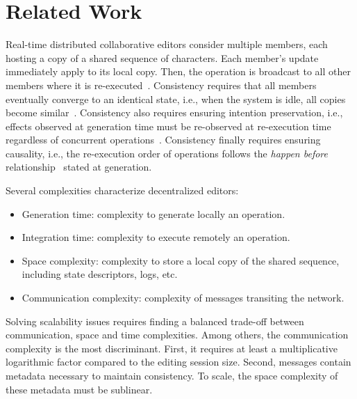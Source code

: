 \section{Related Work}
\label{sec:relatedwork}

Real-time distributed collaborative editors consider multiple members, each
hosting a copy of a shared sequence of characters. Each member's update
immediately apply to its local copy. Then, the operation is broadcast to all
other members where it is re-executed~\cite{saito2005optimistic}. Consistency
requires that all members eventually converge to an identical state, i.e., when
the system is idle, all copies become
similar~\cite{bailis2013eventual}. Consistency also requires ensuring intention
preservation, i.e., effects observed at generation time must be re-observed at
re-execution time regardless of concurrent
operations~\cite{sun1998achieving}. Consistency finally requires ensuring
causality, i.e., the re-execution order of operations follows the \emph{happen
  before} relationship~\cite{lamport1978time} stated at generation.

Several complexities characterize decentralized editors:
\begin{itemize}
\item Generation time: complexity to generate locally an operation.
\item Integration time: complexity to execute remotely an operation.
\item Space complexity: complexity to store a local copy of the shared sequence,
  including state descriptors, logs, etc.
\item Communication complexity: complexity of messages transiting the network.
\end{itemize}
Solving scalability issues requires finding a balanced trade-off between
communication, space and time complexities.  Among others, the communication
complexity is the most discriminant. First, it requires at least a
multiplicative logarithmic factor compared to the editing session size. Second,
messages contain metadata necessary to maintain consistency. To scale, the space
complexity of these metadata must be sublinear.

